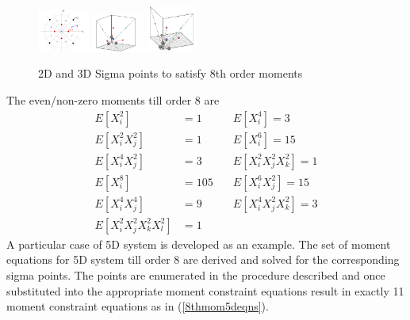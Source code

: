 \documentclass[letterpaper, 10 pt, conference]{ieeeconf}  %
\begin{document}
        \begin{figure}[thpb]
      \centering
      \includegraphics[width=0.15\textwidth]{2dhscaledaxis}
      \includegraphics[width=0.15\textwidth]{3d3}
      \includegraphics[width=0.15\textwidth]{3d4}
      \caption{2D and 3D Sigma points to satisfy 8th order moments}
      \label{fig:23d6m}
   \end{figure}
The even/non-zero moments till order 8 are 
\setlength{\arraycolsep}{0.0em}
\begin{eqnarray}
E[X_i^2]&=1 \quad &E[X_i^4]=3 \nonumber\\
E[X_i^2X_j^2]&=1 \quad &E[X_i^6]=15\nonumber\\
E[X_i^4X_j^2]&=3 \quad &E[X_i^2X_j^2X_k^2]=1\nonumber\\
E[X_i^8]&=105 \quad &E[X_i^6X_j^2]=15\nonumber\\
E[X_i^4X_j^4]&=9 \quad &E[X_i^4X_j^2X_k^2]=3\nonumber\\
E[X_i^2X_j^2X_k^2X_l^2]&=1 \quad &
\end{eqnarray}
\setlength{\arraycolsep}{5pt}
A particular case of 5D system is developed as an example. The set of moment equations for 5D system till order 8 are derived and solved for the corresponding sigma points. The points are enumerated in the procedure described and once substituted into the appropriate moment constraint equations result in exactly 11 moment constraint equations as in (\ref{8thmom5deqns}).
\end{document}
